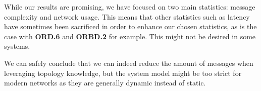 While our results are promising, we have focused on two main statistics: message complexity and network usage. This means that other statistics such as latency have sometimes been sacrificed in order to enhance our chosen statistics, as is the case with \textbf{ORD.6} and \textbf{ORBD.2} for example. This might not be desired in some systems.

We can safely conclude that we can indeed reduce the amount of messages when leveraging topology knowledge, but the system model might be too strict for modern networks as they are generally dynamic instead of static. 